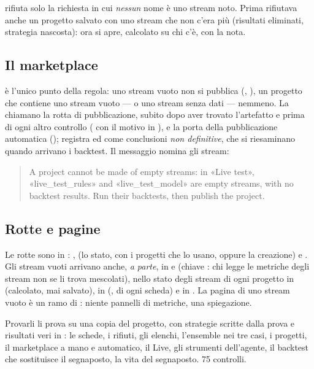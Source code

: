  rifiuta solo la richiesta in cui
\emph{nessun} nome è uno stream noto. Prima rifiutava anche un progetto
salvato con uno stream che non c'era più (risultati eliminati, strategia
nascosta): ora si apre, calcolato su chi c'è, con la nota.

\subsection{Il marketplace}

 è l'unico
punto della regola: uno stream vuoto non si pubblica (,
), un progetto che contiene uno stream vuoto --- o uno stream
senza dati --- nemmeno. La chiamano la rotta di pubblicazione, subito dopo aver
trovato l'artefatto e prima di ogni altro controllo ( con il motivo
in ), e la porta della pubblicazione automatica
();  registra
 ed  come conclusioni \emph{non
definitive}, che si riesaminano quando arrivano i backtest. Il messaggio nomina
gli stream:

\begin{quote}\small\sffamily
A project cannot be made of empty streams: in «Live test», «live\_test\_rules»
and «live\_test\_model» are empty streams, with no backtest results. Run their
backtests, then publish the project.
\end{quote}

\subsection{Rotte e pagine}

Le rotte sono in :
,
 (lo
stato, con i progetti che lo usano, oppure la creazione) e
. Gli stream vuoti arrivano anche,
\emph{a parte}, in  e 
(chiave : chi legge le metriche degli stream non se li
trova mescolati), nello stato degli stream di ogni progetto in
 (calcolato, mai salvato), in
 (,  di ogni
scheda) e in . La pagina di uno stream vuoto è
un ramo di : niente pannelli di metriche, una spiegazione.

\begin{pratica}{Provarli}
 li prova su una copia del progetto, con
strategie scritte dalla prova e risultati veri in : le schede, i
rifiuti, gli elenchi, l'ensemble nei tre casi, i progetti, il marketplace a
mano e automatico, il Live, gli strumenti dell'agente, il backtest che
sostituisce il segnaposto, la vita del segnaposto. \num{75} controlli.
\end{pratica}
